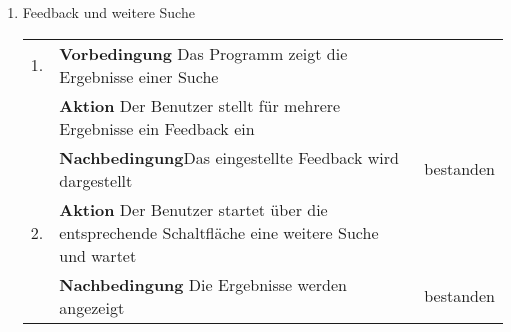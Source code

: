 \begin{enumerate} [label=\bfseries /TS \arabic*0/, leftmargin=*]
\begin{tabular}{@{}rp{4in}|l}
	\end{tabular}
	\par
6. und 10. haben nicht bestanden, da bei der Rückkehr zum ViewerPageWidget nicht mehr das ausgewählte, sondern das erste Bild des Datensatzes angezeigt wird. Das liegt daran, dass dies aufgrund des aktuellen Designs nicht möglich ist. Beim Anzeigen des ViewerPageWidgets wird die reset Methode aufgerufen, unabhängig davon, ob das vorherige PageWidget das Library- oder ParameterPageWidget war. Daher kann nicht unterschieden werden, ob das erste, oder das zuletzt gewählte Bild angezeigt werden soll. Das Testszenario schlägt daher fehl, was aber keine funktionalen Anforderungen betrifft. 
	\pagebreak

	\item Feedback und weitere Suche \newline \newline
	\begin{tabular}{@{}rp{4in}|l}
	1. & \textbf{Vorbedingung} Das Programm zeigt die Ergebnisse einer Suche & \\
	   & \textbf{Aktion} Der Benutzer stellt für mehrere Ergebnisse ein Feedback ein & \\
	   & \textbf{Nachbedingung}Das eingestellte Feedback wird dargestellt & bestanden \\
	\hline	
	2. & \textbf{Aktion} Der Benutzer startet über die entsprechende Schaltfläche eine weitere Suche und wartet & \\
	   & \textbf{Nachbedingung} Die Ergebnisse werden angezeigt & bestanden \\
	 \end{tabular}
	 \newline


\end{enumerate}
